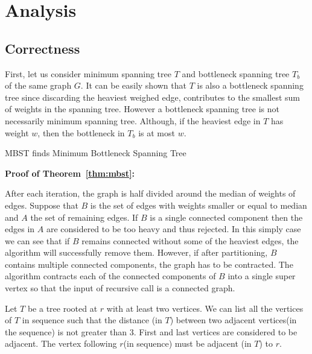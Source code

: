 \documentclass[runningheads, a4paper]{llncs}
\begin{document}
\section{Analysis}

\subsection{Correctness}

First, let us consider minimum spanning tree $T$ and bottleneck spanning tree $T_{b}$ of the same graph $G$. It can be easily shown that $T$ is also a bottleneck spanning tree since discarding the heaviest weighed edge, contributes to the smallest sum of weights in the spanning tree. However a bottleneck spanning tree is not necessarily minimum spanning tree. Although, if the heaviest edge in $T$ has weight $w$, then the bottleneck in $T_{b}$ is at most $w$.

\begin{theorem} \label{thm:mbst}
    MBST finds Minimum Bottleneck Spanning Tree
\end{theorem}

\textbf {Proof of Theorem~\ref{thm:mbst}:}

After each iteration, the graph is half divided around the median of weights of edges. Suppose that $B$ is the set of edges with weights smaller or equal to median and $A$ the set of remaining edges. If $B$ is a single connected component then the edges in $A$ are considered to be too heavy and thus rejected. In this simply case we can see that if $B$ remains connected without some of the heaviest edges, the algorithm will successfully remove them. However, if after partitioning, $B$ contains multiple connected components, the graph has to be contracted. The algorithm contracts each of the connected components of $B$ into a single super vertex so that the input of recursive call is a connected graph.

\begin{theorem} \label{thm:tree_seq}
    Let $T$ be a tree rooted at $r$ with at least two vertices. We can list all the vertices of $T$ in sequence such that the distance (in $T$) between two adjacent vertices(in the sequence) is not greater than 3. First and last vertices are considered to be adjacent. The vertex following $r$(in sequence) must be adjacent (in $T$) to $r$.
\end{theorem}
\end{document}
